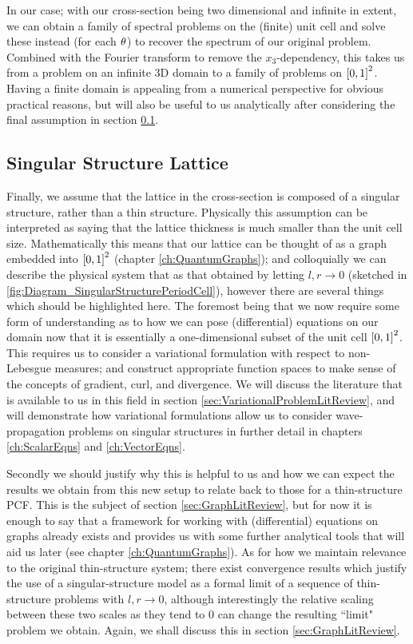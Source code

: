In our case; with our cross-section being two dimensional and infinite in extent, we can obtain a family of spectral problems on the (finite) unit cell and solve these instead (for each $\theta$) to recover the spectrum of our original problem.
Combined with the Fourier transform to remove the $x_3$-dependency, this takes us from a problem on an infinite 3D domain to a family of problems on $\left[ 0,1 \right]^2$.
Having a finite domain is appealing from a numerical perspective for obvious practical reasons, but will also be useful to us analytically after considering the final assumption in section \ref{sec:ModellingAssumption3}.

\subsection{Singular Structure Lattice} \label{sec:ModellingAssumption3}
Finally, we assume that the lattice in the cross-section is composed of a singular structure, rather than a thin structure.
Physically this assumption can be interpreted as saying that the lattice thickness is much smaller than the unit cell size.
Mathematically this means that our lattice can be thought of as a graph embedded into $\left[ 0,1 \right]^2$ (chapter \ref{ch:QuantumGraphs}); and colloquially we can describe the physical system that as that obtained by letting $l,r\rightarrow0$ (sketched in \ref{fig:Diagram_SingularStructurePeriodCell}), however there are several things which should be highlighted here.
The foremost being that we now require some form of understanding as to how we can pose (differential) equations on our domain now that it is essentially a one-dimensional subset of the unit cell $\left[ 0,1 \right]^2$.
This requires us to consider a variational formulation with respect to non-Lebesgue measures; and construct appropriate function spaces to make sense of the concepts of gradient, curl, and divergence.
We will discuss the literature that is available to us in this field in section \ref{sec:VariationalProblemLitReview}, and will demonstrate how variational formulations allow us to consider wave-propagation problems on singular structures in further detail in chapters \ref{ch:ScalarEqns} and \ref{ch:VectorEqns}. \newline

Secondly we should justify why this is helpful to us and how we can expect the results we obtain from this new setup to relate back to those for a thin-structure PCF.
This is the subject of section \ref{sec:GraphLitReview}, but for now it is enough to say that a framework for working with (differential) equations on graphs already exists and provides us with some further analytical tools that will aid us later (see chapter \ref{ch:QuantumGraphs}).
As for how we maintain relevance to the original thin-structure system; there exist convergence results which justify the use of a singular-structure model as a formal limit of a sequence of thin-structure problems with $l,r\rightarrow0$, although interestingly the relative scaling between these two scales as they tend to 0 can change the resulting ``limit" problem we obtain.
Again, we shall discuss this in section \ref{sec:GraphLitReview}.


